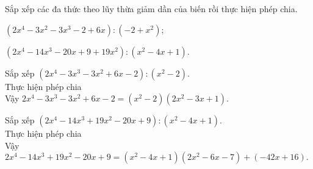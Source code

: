 \begin{vd}  %
	Sắp xếp các đa thức theo lũy thừa giảm dần của biến rồi thực hiện phép chia.
	\begin{listEX}
		\item $(2x^4-3x^2-3x^3-2+6x): (-2+x^2)$;
		\item $(2x^4-14x^3-20x+9+19x^2):(x^2-4x+1)$.
	\end{listEX}
	\loigiai
	{
		\begin{listEX}
		\item Sắp xếp $(2x^4-3x^3-3x^2+6x-2):(x^2-2).$\\
		Thực hiện phép chia \\
		Vậy $2x^4-3x^3-3x^2+6x-2=(x^2-2)(2x^2-3x+1).$
		\item Sắp xếp $(2x^4-14x^3+19x^2-20x+9):(x^2-4x+1).$\\
		Thực hiện phép chia \\
		Vậy $2x^4-14x^3+19x^2-20x+9=(x^2-4x+1)(2x^2-6x-7)+(-42x+16).$
	\end{listEX}	
	}
\end{vd}

